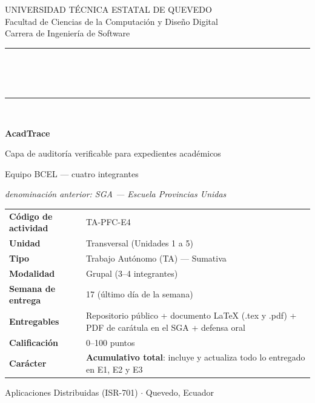 \documentclass[11pt,a4paper]{article}
\begin{document}
	
	\begin{titlepage}
		\centering
		\vspace*{0.9cm}
		{\small\color{uteqGray} UNIVERSIDAD TÉCNICA ESTATAL DE QUEVEDO\\ Facultad de Ciencias de la Computación y Diseño Digital\\ Carrera de Ingeniería de Software\par}
		\vspace{16pt}
		{\color{uteqBlue}\rule{\textwidth}{2pt}}\\[8pt]
		\colorbox{uteqBlue}{\parbox{0.96\textwidth}{\centering{}\vspace{5pt}}}\\[8pt]
		{\color{uteqBlue}\rule{\textwidth}{2pt}}\\[18pt]
		{\LARGE\bfseries\color{uteqBlue} AcadTrace\par}
		\vspace{5pt}
		{\large\color{uteqGray} Capa de auditoría verificable para expedientes académicos\par}
		\vspace{4pt}
		{\normalsize\color{uteqGray} Equipo BCEL --- cuatro integrantes\par}
		\vspace{3pt}
		{\footnotesize\color{uteqGray}\emph{denominación anterior: SGA --- Escuela Provincias Unidas}\par}
		\vspace{22pt}
		\begin{minipage}{0.92\textwidth}
			\small
			\begin{tabular}{@{}p{4.3cm}p{9.6cm}@{}}
				\toprule
				\textbf{Código de actividad} & TA-PFC-E4 \\
				\textbf{Unidad} & Transversal (Unidades 1 a 5) \\
				\textbf{Tipo} & Trabajo Autónomo (TA) --- Sumativa \\
				\textbf{Modalidad} & Grupal (3--4 integrantes) \\
				\textbf{Semana de entrega} & 17 (último día de la semana) \\
				\textbf{Entregables} & Repositorio público + documento LaTeX (.tex y .pdf) + PDF de carátula en el SGA + defensa oral \\
				\textbf{Calificación} & 0--100 puntos \\
				\textbf{Carácter} & \textbf{Acumulativo total}: incluye y actualiza todo lo entregado en E1, E2 y E3 \\
				\bottomrule
			\end{tabular}
		\end{minipage}
		\vfill
		{\small\color{uteqGray} Aplicaciones Distribuidas (ISR-701) $\cdot$ Quevedo, Ecuador\par}
	\end{titlepage}
	
\end{document}
